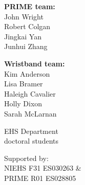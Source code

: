 \documentclass{beamer}
\begin{document}
{\begin{columns}

\begin{flushright}
\scriptsize
{\color{matbluedark} \textbf{PRIME team:}} \\
            John Wright \\
            Robert Colgan \\
            Jingkai Yan \\
            Junhui Zhang \\

\vspace{5mm}

{\color{matbluedark} \textbf{Wristband team:}} \\
Kim Anderson \\
Lisa Bramer \\
Haleigh Cavalier \\
Holly Dixon \\
Sarah McLarnan \\

\vspace{5mm}

EHS Department \\ doctoral students

\vspace{5mm}

{\tiny\color{gray}Supported by: \\
NIEHS F31 ES030263 \& \\
PRIME R01 ES028805 \\
}

\end{flushright}

\end{columns}
}
\end{document}
